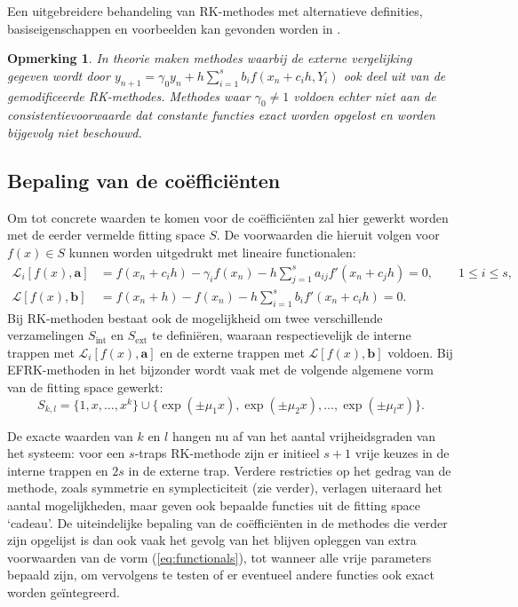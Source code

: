 \documentclass[12pt]{article}
\newtheorem{opm}[defn]{Opmerking}
\begin{document}
Een uitgebreidere behandeling van RK-methodes met alternatieve definities, basiseigenschappen en voorbeelden kan gevonden worden in \cite{gnm}.
\begin{opm} \label{opm:consistent}
In theorie maken methodes waarbij de externe vergelijking gegeven wordt door \(y_{n+1}=\gamma_0y_n+h\sum\limits_{i=1}^sb_if(x_n+c_ih,Y_i)\) ook deel uit van de gemodificeerde RK-methodes. Methodes waar \(\gamma_0\ne1\) voldoen echter niet aan de consistentievoorwaarde dat constante functies exact worden opgelost en worden bijgevolg niet beschouwd.
\end{opm}

\subsection{Bepaling van de coëfficiënten}
Om tot concrete waarden te komen voor de coëfficiënten zal hier gewerkt worden met de eerder vermelde fitting space \(S\). De voorwaarden die hieruit volgen voor \(f(x)\in S\) kunnen worden uitgedrukt met lineaire functionalen:
\begin{equation} \label{eq:functionals}
\begin{split}
    \mathcal{L}_i[f(x),\mathbf{a}]&=f(x_n+c_ih)-\gamma_if(x_n)-h\sum\limits_{j=1}^sa_{ij}f'(x_n+c_jh)=0,\qquad 1\le i\le s, \\
     \mathcal{L}[f(x),\mathbf{b}]&=f(x_n+h)-f(x_n)-h\sum\limits_{i=1}^sb_if'(x_n+c_ih)=0.
\end{split}
\end{equation}
Bij RK-methoden bestaat ook de mogelijkheid om twee verschillende verzamelingen \(S_{\text{int}}\) en \(S_{\text{ext}}\) te definiëren, waaraan respectievelijk de interne trappen met \(\mathcal{L}_i[f(x),\mathbf{a}]\) en de externe trappen met \(\mathcal{L}[f(x),\mathbf{b}]\) voldoen. Bij EFRK-methoden in het bijzonder wordt vaak met de volgende algemene vorm van de fitting space gewerkt:
\[S_{k,l}=\{1,x,\dots,x^k\}\cup\{\exp(\pm\mu_1x),\exp(\pm\mu_2x),\dots,\exp(\pm\mu_lx)\}.\]

De exacte waarden van \(k\) en \(l\) hangen nu af van het aantal vrijheidsgraden van het systeem: voor een \(s\)-traps RK-methode zijn er initieel \(s+1\) vrije keuzes in de interne trappen en \(2s\) in de externe trap. Verdere restricties op het gedrag van de methode, zoals symmetrie en symplecticiteit (zie verder), verlagen uiteraard het aantal mogelijkheden, maar geven ook bepaalde functies uit de fitting space `cadeau'. De uiteindelijke bepaling van de coëfficiënten in de methodes die verder zijn opgelijst is dan ook vaak het gevolg van het blijven opleggen van extra voorwaarden van de vorm (\ref{eq:functionals}), tot wanneer alle vrije parameters bepaald zijn, om vervolgens te testen of er eventueel andere functies ook exact worden geïntegreerd.
\end{document}

